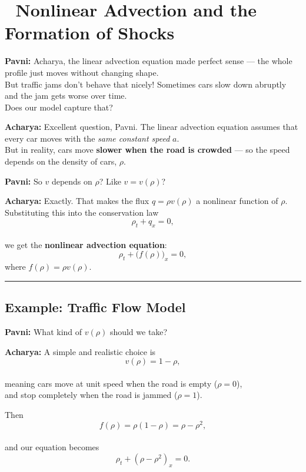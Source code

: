\documentclass[
  letterpaper,
]{book}
\begin{document}
\section{🚦 Nonlinear Advection and the Formation of
Shocks}\label{nonlinear-advection-and-the-formation-of-shocks}

\textbf{Pavni:} Acharya, the linear advection equation made perfect
sense --- the whole profile just moves without changing shape.\\
But traffic jams don't behave that nicely! Sometimes cars slow down
abruptly and the jam gets worse over time.\\
Does our model capture that?

\textbf{Acharya:} Excellent question, Pavni. The linear advection
equation assumes that every car moves with the \emph{same constant
speed} \(a\).\\
But in reality, cars move \textbf{slower when the road is crowded} ---
so the speed depends on the density of cars, \(\rho\).

\textbf{Pavni:} So \(v\) depends on \(\rho\)? Like \(v = v(\rho)\)?

\textbf{Acharya:} Exactly. That makes the flux \(q = \rho v(\rho)\) a
nonlinear function of \(\rho\).\\
Substituting this into the conservation law\\
\[
\rho_t + q_x = 0,
\]\\
we get the \textbf{nonlinear advection equation}: \[
\rho_t + \big(f(\rho)\big)_x = 0,
\] where \(f(\rho) = \rho v(\rho)\).

\begin{center}\rule{0.5\linewidth}{0.5pt}\end{center}

\subsection{Example: Traffic Flow
Model}\label{example-traffic-flow-model}

\textbf{Pavni:} What kind of \(v(\rho)\) should we take?

\textbf{Acharya:} A simple and realistic choice is\\
\[
v(\rho) = 1 - \rho,
\]\\
meaning cars move at unit speed when the road is empty (\(\rho=0\)),\\
and stop completely when the road is jammed (\(\rho=1\)).

Then\\
\[
f(\rho) = \rho(1 - \rho) = \rho - \rho^2,
\]\\
and our equation becomes \[
\rho_t + (\rho - \rho^2)_x = 0.
\]
\end{document}
